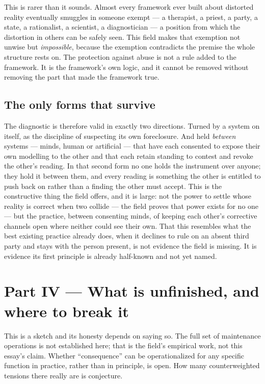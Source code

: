 \documentclass{article}
\begin{document}
This is rarer than it sounds. Almost every framework ever built about distorted reality eventually smuggles in someone exempt --- a therapist, a priest, a party, a state, a rationalist, a scientist, a diagnostician --- a position from which the distortion in others can be safely seen. This field makes that exemption not unwise but \textit{impossible}, because the exemption contradicts the premise the whole structure rests on. The protection against abuse is not a rule added to the framework. It is the framework's own logic, and it cannot be removed without removing the part that made the framework true.

\subsection*{The only forms that survive}
The diagnostic is therefore valid in exactly two directions. Turned by a system on itself, as the discipline of suspecting its own foreclosure. And held \textit{between} systems --- minds, human or artificial --- that have each consented to expose their own modelling to the other and that each retain standing to contest and revoke the other's reading. In that second form no one holds the instrument over anyone; they hold it between them, and every reading is something the other is entitled to push back on rather than a finding the other must accept. This is the constructive thing the field offers, and it is large: not the power to settle whose reality is correct when two collide --- the field proves that power exists for no one --- but the practice, between consenting minds, of keeping each other's corrective channels open where neither could see their own. That this resembles what the best existing practice already does, when it declines to rule on an absent third party and stays with the person present, is not evidence the field is missing. It is evidence its first principle is already half-known and not yet named.

\section*{Part IV --- What is unfinished, and where to break it}

This is a sketch and its honesty depends on saying so. The full set of maintenance operations is not established here; that is the field's empirical work, not this essay's claim. Whether ``consequence'' can be operationalized for any specific function in practice, rather than in principle, is open. How many counterweighted tensions there really are is conjecture.
\end{document}
